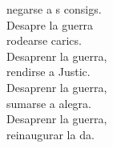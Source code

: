 \begin{cancion}
	negarse a s consigs. \\
	Desapre la guerra\\
	rodearse  carics. \\
	Desaprenr la guerra,\\
	rendirse a  Justic. \\
	Desaprenr la guerra,\\
	sumarse a  alegra. \\
	Desaprenr la guerra,\\
	reinaugurar la da. \\
	\jump
\end{cancion}%
